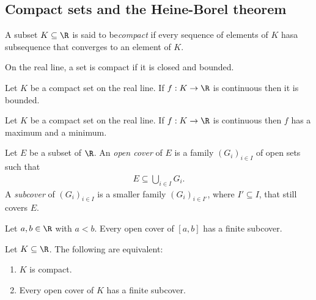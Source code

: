 \documentclass{article}
\begin{document}
\subsection{Compact sets and the Heine-Borel theorem}

\begin{definition}
    A subset $K\subseteq\R$ is said to be\emph{compact} if every sequence of elements 
    of $K$ hasa subsequence that converges to an element of $K$. 
\end{definition}

\begin{theorem}[Notes 2.15]
    On the real line, a set is compact if it is closed and bounded. 
\end{theorem}

\begin{theorem}[Notes 2.17]
    Let $K$ be a compact set on the real line. If $f:K\to\R$ is continuous
    then it is bounded.
\end{theorem}

\begin{theorem}
    Let $K$ be a compact set on the real line. If $f:K\to\R$ is continuous
    then $f$ has a maximum and a minimum.
\end{theorem}

\begin{definition}
    Let $E$ be a subset of $\R$. An \emph{open cover} of $E$ is a family 
    $(G_i)_{i\in I}$ of open sets such that 
    \begin{align*}
        E\subseteq \bigcup_{i\in I}G_i.
    \end{align*}
    A \emph{subcover} of $(G_i)_{i\in I}$ is a smaller family $(G_i)_{i\in I'}$, 
    where $I'\subseteq I$, that still covers $E$.
\end{definition}

\begin{theorem}
    Let $a,b\in\R$ with $a<b$. Every open cover of $[a,b]$ has a finite subcover. 
\end{theorem}

\begin{theorem}[Notes 2.21]
    Let $K\subseteq\R$. The following are equivalent:
    \begin{enumerate}
        \item $K$ is compact.
        \item Every open cover of $K$ has a finite subcover.
    \end{enumerate} 
\end{theorem}
\end{document}
